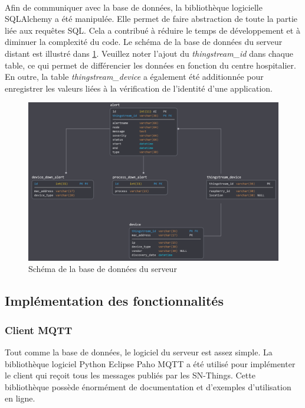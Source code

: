 ~

\noindent
Afin de communiquer avec la base de données, la bibliothèque logicielle SQLAlchemy a été manipulée. Elle permet de faire abstraction de toute la partie liée aux requêtes SQL. Cela a contribué à réduire le temps de développement et à diminuer la complexité du code. Le schéma de la base de données du serveur distant est illustré dans \ref{fig:server_db_schema}. Veuillez noter l’ajout du \textit{thingstream\_id} dans chaque table, ce qui permet de différencier les données en fonction du centre hospitalier. En outre, la table \textit{thingstream\_device} a également été additionnée pour enregistrer les valeurs liées à la vérification de l’identité d’une application.


\begin{figure}[ht!]
  \includegraphics[width=\textwidth]{img/app/db_final.png}
  \caption{Schéma de la base de données du serveur}
  \label{fig:server_db_schema}
\end{figure}


\subsection{Implémentation des fonctionnalités}

\subsubsection{Client MQTT}

\noindent
Tout comme la base de données, le logiciel du serveur est assez simple. La bibliothèque logiciel Python Eclipse Paho MQTT a été utilisé pour implémenter le client qui reçoit tous les messages publiés par les SN-Things. Cette bibliothèque possède énormément de documentation et d’exemples d’utilisation en ligne.

